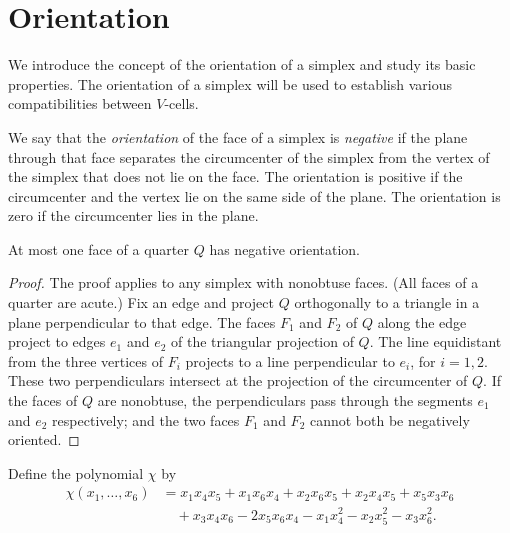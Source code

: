 \section{Orientation}
\label{sec:orientation}

We introduce the concept of the orientation of a simplex and study
its basic properties.  The orientation of a simplex will be used
to establish various compatibilities between $V$-cells.

\begin{definition} \label{def:orientation}
We say that the {\it orientation\/} of the face of a simplex is
{\it negative} if the plane through that face separates the
circumcenter of the simplex from the vertex of the simplex that
does not lie on the face.  The orientation is positive if the
circumcenter and the vertex lie on the same side of the plane. The
orientation is zero if the circumcenter lies in the plane.
\end{definition}

\begin{lemma} \label{lemma:at-most-one-negative}
At most one face of a quarter $Q$ has negative orientation.
\end{lemma}


\begin{proof}
The proof applies to any simplex with nonobtuse faces. (All faces
of a quarter are acute.) Fix an edge and project $Q$ orthogonally
to a triangle in a plane perpendicular to that edge. The faces
$F_1$ and $F_2$ of $Q$ along the edge project to edges $e_1$ and
$e_2$ of the triangular projection of $Q$. The line equidistant
from the three vertices of $F_i$ projects to a line perpendicular
to $e_i$, for $i=1,2$. These two perpendiculars intersect at the
projection of the circumcenter of $Q$.  If the faces of $Q$ are
nonobtuse, the perpendiculars pass through the segments $e_1$ and
$e_2$ respectively; and the two faces $F_1$ and $F_2$ cannot both
be negatively oriented.
\end{proof}

\begin{definition}
    \label{def:chi}
Define the polynomial $\chi$ by
    $$
    \begin{array}{lll}
    \chi(x_1,\ldots,x_6)
    &= x_1 x_4 x_5 + x_1 x_6 x_4 + x_2 x_6 x_5 + x_2 x_4 x_5 + x_5 x_3 x_6 \\
        &\quad+ x_3 x_4 x_6 - 2 x_5 x_6 x_4 - x_1 x_4^2 - x_2 x_5^2 - x_3 x_6^2.
    \end{array}
    $$
\end{definition}

